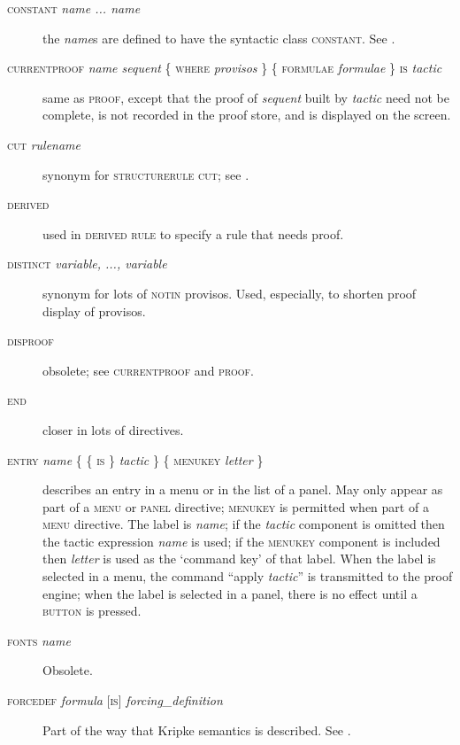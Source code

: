 \begin{description}
\item[\textsc{constant} \textit{name ... name}] the \textit{name}s are defined to have the syntactic class \textsc{constant}. See .

\item[\textsc{currentproof} \textit{name sequent} \{ \textsc{where} \textit{provisos} \} \{ \textsc{formulae} \textit{formulae} \} \textsc{is} \textit{tactic}] same as \textsc{proof}, except that the proof of \textit{sequent} built by \textit{tactic} need not be complete, is not recorded in the proof store, and is displayed on the screen.

\item[\textsc{cut} \textit{rulename}] synonym for \textsc{structurerule} \textsc{cut}; see .

\item[\textsc{derived}] used in \textsc{derived rule} to specify a rule that needs proof.

\item[\textsc{distinct} \textit{variable, ..., variable}] synonym for lots of \textsc{notin} provisos. Used, especially, to shorten proof display of provisos.

\item[\textsc{disproof}] obsolete; see \textsc{currentproof} and \textsc{proof}.

\item[\textsc{end}] closer in lots of directives.

\item[\textsc{entry} \textit{name} \{ \{ \textsc{is} \} \textit{tactic} \} \{ \textsc{menukey} \textit{letter} \}] describes an entry in a menu or in the list of a panel. May only appear as part of a \textsc{menu} or \textsc{panel} directive; \textsc{menukey} is permitted when part of a \textsc{menu} directive. The label is \textit{name}; if the \textit{tactic} component is omitted then the tactic expression \textit{name} is used; if the \textsc{menukey} component is included then \textit{letter} is used as the `command key' of that label. When the label is selected in a menu, the command ``apply \textit{tactic}'' is transmitted to the proof engine; when the label is selected in a panel, there is no effect until a \textsc{button} is pressed.

\item[\textsc{fonts} \textit{name}] Obsolete.

\item[\textsc{forcedef} \textit{formula} {[}\textsc{is}{]} \textit{forcing\_definition}] Part of the way that Kripke semantics is described. See .


\end{description}
